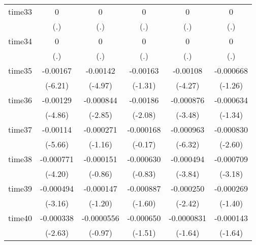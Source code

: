 \begin{table}[htbp]
\begin{tabular}{l*{5}{c}}
time33      &           0         &           0         &           0         &           0         &           0         \\
            &         (.)         &         (.)         &         (.)         &         (.)         &         (.)         \\
time34      &           0         &           0         &           0         &           0         &           0         \\
            &         (.)         &         (.)         &         (.)         &         (.)         &         (.)         \\
time35      &    -0.00167\sym{***}&    -0.00142\sym{***}&    -0.00163         &    -0.00108\sym{***}&   -0.000668         \\
            &     (-6.21)         &     (-4.97)         &     (-1.31)         &     (-4.27)         &     (-1.26)         \\
time36      &    -0.00129\sym{***}&   -0.000844\sym{**} &    -0.00186\sym{*}  &   -0.000876\sym{***}&   -0.000634         \\
            &     (-4.86)         &     (-2.85)         &     (-2.08)         &     (-3.48)         &     (-1.34)         \\
time37      &    -0.00114\sym{***}&   -0.000271         &   -0.000168         &   -0.000963\sym{***}&   -0.000830\sym{**} \\
            &     (-5.66)         &     (-1.16)         &     (-0.17)         &     (-6.32)         &     (-2.60)         \\
time38      &   -0.000771\sym{***}&   -0.000151         &   -0.000630         &   -0.000494\sym{***}&   -0.000709\sym{**} \\
            &     (-4.20)         &     (-0.86)         &     (-0.83)         &     (-3.84)         &     (-3.18)         \\
time39      &   -0.000494\sym{**} &   -0.000147         &   -0.000887         &   -0.000250\sym{*}  &   -0.000269         \\
            &     (-3.16)         &     (-1.20)         &     (-1.60)         &     (-2.42)         &     (-1.40)         \\
time40      &   -0.000338\sym{**} &  -0.0000556         &   -0.000650         &  -0.0000831         &   -0.000143         \\
            &     (-2.63)         &     (-0.97)         &     (-1.51)         &     (-1.64)         &     (-1.64)         \\

\end{tabular}
\end{table}
